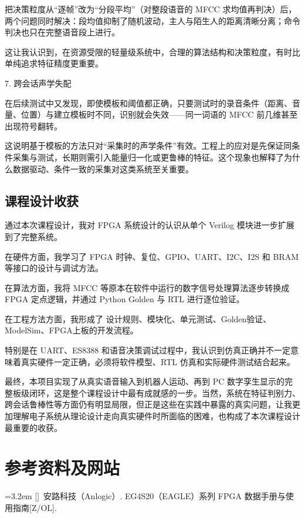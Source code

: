 \documentclass[UTF8,zihao=-4,fontset=windows]{ctexart}
\newcommand{\subhead}[1]{%
  \par\medskip
  {\heiti\zihao{-4}#1}
  \nopagebreak
  \par\smallskip
}
\newcounter{refc}
\newcommand{\refx}[1]{%
  \stepcounter{refc}%
  \par
  \noindent
  \hangindent=3.2em
  \hangafter=1
  [\arabic{refc}]\ #1
  \par\vspace{2pt}
}
\begin{document}
把决策粒度从“逐帧”改为“分段平均”（对整段语音的 MFCC 求均值再判决）后，两个问题同时解决：段均值抑制了随机波动，主人与陌生人的距离清晰分离；命令判决也只在完整语音段上进行。

这让我认识到，在资源受限的轻量级系统中，合理的算法结构和决策粒度，有时比单纯追求特征精度更重要。

\subhead{7. 跨会话声学失配}

在后续测试中又发现，即使模板和阈值都正确，只要测试时的录音条件（距离、音量、位置）与建立模板时不同，识别就会失效——同一词语的 MFCC 前几维甚至出现符号翻转。

这说明基于模板的方法只对“采集时的声学条件”有效。工程上的应对是先保证同条件采集与测试，长期则需引入能量归一化或更鲁棒的特征。这个现象也解释了为什么数据驱动、条件一致的采集对这类系统至关重要。

\subsection{课程设计收获}

通过本次课程设计，我对 FPGA 系统设计的认识从单个 Verilog 模块进一步扩展到了完整系统。

在硬件方面，我学习了 FPGA 时钟、复位、GPIO、UART、I2C、I2S 和 BRAM 等接口的设计与调试方法。

在算法方面，我将 MFCC 等原本在软件中运行的数字信号处理算法逐步转换成 FPGA 定点逻辑，并通过 Python Golden 与 RTL 进行逐位验证。

在工程方法方面，我形成了
设计规则、模块化、单元测试、Golden验证、ModelSim、FPGA上板的开发流程。

特别是在 UART、ES8388 和语音决策调试过程中，我认识到仿真正确并不一定意味着真实硬件一定正确，必须将软件模型、RTL 仿真和实际硬件测试结合起来。

最终，本项目实现了从真实语音输入到机器人运动、再到 PC 数字孪生显示的完整板级闭环，这是整个课程设计中最有成就感的一步。当然，系统在特征判别力、跨会话鲁棒性等方面仍有明显局限，但正是这些在实践中暴露的真实问题，让我更加理解电子系统从理论设计走向真实硬件时所面临的困难，也构成了本次课程设计最重要的收获。

\section{参考资料及网站}

\refx{安路科技（Anlogic）. EG4S20（EAGLE）系列 FPGA 数据手册与使用指南[Z/OL].}
\end{document}
